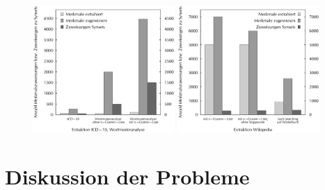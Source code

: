 \documentclass[pagesize,paper=A4,DIV=calc,fontsize=12pt,draft=false]{scrreprt}
\begin{document}
\begin{figure}[!ht]
\includegraphics[width=0.48\textwidth]{icd10_affixe.eps}
\hfill
\includegraphics[width=0.48\textwidth]{wiki_extraktion.eps}
\end{figure}


\section{Diskussion der Probleme}
\end{document}
